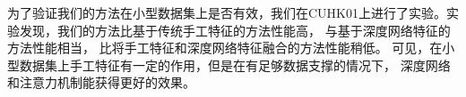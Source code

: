 为了验证我们的方法在小型数据集上是否有效，我们在CUHK01上进行了实验。实验发现，我们的方法比基于传统手工特征的方法性能高，
与基于深度网络特征的方法性能相当，
比将手工特征和深度网络特征融合的方法性能稍低。
可见，在小型数据集上手工特征有一定的作用，但是在有足够数据支撑的情况下，
深度网络和注意力机制能获得更好的效果。

